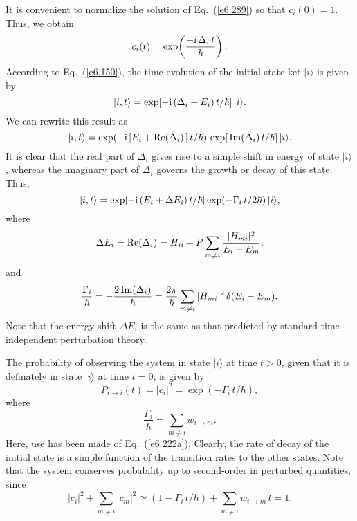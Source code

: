 It is convenient to normalize the solution of
Eq.~(\ref{e6.289}) so that $c_i(0) = 1$. Thus, we obtain
\begin{equation}
c_i(t) = \exp\!\left(\frac{-{\rm i}\, \Delta_i\, t}{\hbar}\right).
\end{equation}
According to Eq.~(\ref{e6.150}),  the time evolution of the initial
state ket $|i\rangle$ is given by
\begin{equation}
|i, t\rangle = \exp[-{\rm i}\,(\Delta_i + E_i)\,t/\hbar] \,|i\rangle.
\end{equation}
We can rewrite this result as
\begin{equation}\label{e6.295}
|i, t\rangle = \exp(-{\rm i}\,[E_i + {\rm Re}(\Delta_i)\,]\,t/\hbar)\,
\exp[\,{\rm Im}(\Delta_i)\,t/\hbar] \,|i\rangle.
\end{equation}
It is clear that the real part of $\Delta_i$ gives rise to a simple
shift in energy of state $|i\rangle$, whereas the imaginary part of
$\Delta_i$ governs the growth or decay  of this state. 
Thus,
\begin{equation}
|i, t\rangle = \exp[-{\rm i}\,(E_i + \Delta E_i)\,t/\hbar]
\exp( - \Gamma_i\,t/2\hbar)\,|i\rangle,
\end{equation}
where
\begin{equation}
\Delta E_i = {\rm  Re}(\Delta_i) =  H_{ii} + P \sum_{m\neq i}
\frac{|H_{mi}|^2}{E_i - E_m} ,
\end{equation}
and
\begin{equation}
\frac{\Gamma_i}{\hbar} = - \frac{2\,{\rm Im}(\Delta_i)}{\hbar}
= \frac{2\pi}{\hbar} \sum_{m\neq i} |H_{mi}|^2\,\delta(E_i - E_m).
\end{equation}
Note that the energy-shift $\Delta E_i$ is the same as that predicted
by standard time-independent perturbation theory. 

The probability of observing the system in state $|i\rangle$ at time $t>0$, given
that it is definately in state $|i\rangle$ at time $t=0$, is given by
\begin{equation}
P_{i\rightarrow i} (t) = |c_i|^2 = \exp(-\Gamma_i\,t/ \hbar),
\end{equation}
where 
\begin{equation}
\frac{\Gamma_i}{\hbar} = \sum_{m\neq i} w_{i\rightarrow m}.
\end{equation}
Here, use has been made of Eq.~(\ref{e6.222a}).
Clearly, the rate of decay of the initial state is  a simple function of 
the transition rates to the other states.  Note that the system conserves
 probability up to second-order in perturbed quantities, since
\begin{equation}
|c_i|^2 + \sum_{m\neq i} |c_m|^2 \simeq (1- \Gamma_i\,t/ \hbar)
+ \sum_{m\neq i} w_{i\rightarrow m} \,t = 1.
\end{equation}

